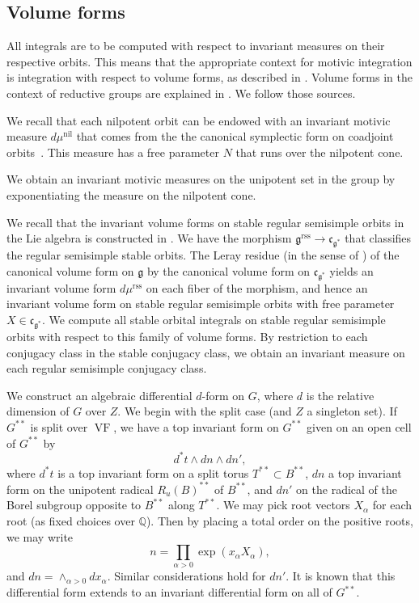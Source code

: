 \documentclass[12pt]{amsart}
\newcommand{\op}[1]{\operatorname{#1}}
\newcommand{\ring}[1]{{\mathbb #1}}
\newcommand{\fg}{\mathfrak{g}}
\newcommand{\fc}{\mathfrak{c}}
\newcommand{\reg}{\mathrm{rss}}
\theoremstyle{plain}
\theoremstyle{definition}
\begin{document}
\subsection{Volume forms}\label{sec:volume}

All integrals are to be computed with respect to invariant measures on
their respective orbits.  This means that the appropriate context for
motivic integration is integration with respect to volume forms, as
described in \cite[Sec. 8]{CL}.    Volume forms in the context of
reductive groups are explained in \cite{CGH}.  We follow
those sources.

We recall that each nilpotent orbit can be endowed with an invariant
motivic measure $d\mu^{\op{nil}}$ that comes from the the canonical
symplectic form on coadjoint orbits~\cite[Prop.~4.3]{CGH}.  This
measure has a free parameter $N$ that runs over the nilpotent cone.

We obtain an invariant motivic measures on the unipotent set in the
group by exponentiating the measure on the nilpotent cone.

We recall that the invariant volume forms on stable regular semisimple
orbits in the Lie algebra is constructed in \cite{CHL}.  We have the
morphism $\fg^\reg\to\fc_{\fg^*}$ that classifies the regular
semisimple stable orbits.  The Leray residue (in the sense of
\cite{CL}) of the canonical volume form on $\fg$ by the canonical
volume form on $\fc_{\fg^*}$ yields an invariant volume form
$d\mu^\reg$ on each fiber of the morphism, and hence an invariant
volume form on stable regular semisimple orbits with free parameter
$X\in\fc_{\fg^*}$.  We compute all stable orbital integrals on stable
regular semisimple orbits with respect to this family of volume forms.
By restriction to each conjugacy class in the stable conjugacy class,
we obtain an invariant measure on each regular semisimple conjugacy
class.



We construct an algebraic differential $d$-form on $G$, where $d$ is
the relative dimension of $G$ over $Z$.  We begin with the split case
(and $Z$ a singleton set).  If $G^{**}$ is split over $\op{VF}$, we
have a top invariant form on $G^{**}$ given on an open cell of
$G^{**}$ by
\begin{equation}\label{eqn:omegaK}
d^*t\land dn\land dn',
\end{equation}
where $d^*t$ is a top invariant form on a split torus $T^{**} \subset
B^{**}$, $dn$ a top invariant form on the unipotent radical
$R_u(B)^{**}$ of $B^{**}$, and $dn'$ on the radical of the Borel
subgroup opposite to $B^{**}$ along $T^{**}$.  We may pick root
vectors $X_\alpha$ for each root (as fixed choices over $\ring{Q}$).
Then by placing a total order on the positive roots, we may write
\[
n = \prod_{\alpha>0}\exp(x_\alpha X_\alpha),
\]
and $dn = \land_{\alpha>0} dx_\alpha$.  Similar considerations hold
for $dn'$.  It is known that this differential form extends to an
invariant differential form on all of $G^{**}$.
\end{document}
